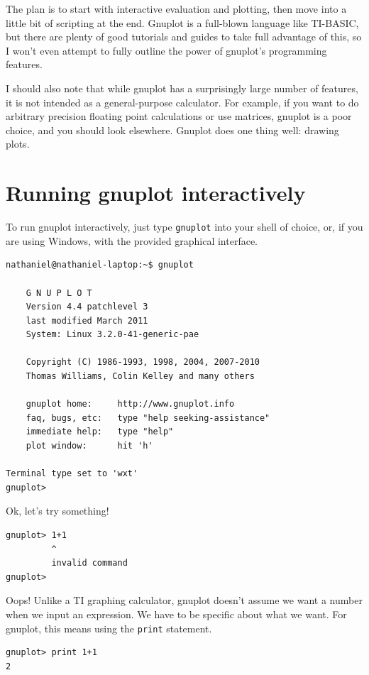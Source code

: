 \documentclass[11pt,letterpaper]{report}
\begin{document}
The plan is to start with interactive evaluation and plotting, then move into a little bit of scripting at the end. Gnuplot is a full-blown language like TI-BASIC, but there are plenty of good tutorials and guides to take full advantage of this, so I won't even attempt to fully outline the power of gnuplot's programming features.

I should also note that while gnuplot has a surprisingly large number of features, it is not intended as a general-purpose calculator. For example, if you want to do arbitrary precision floating point calculations or use matrices, 
 gnuplot is a poor choice, and you should look elsewhere. Gnuplot does one thing well: drawing plots.

\section{Running gnuplot interactively}

To run gnuplot interactively, just type \verb+gnuplot+ into your shell of choice, or, if you are using Windows, with the provided graphical interface.
\begin{lstlisting}
nathaniel@nathaniel-laptop:~$ gnuplot

	G N U P L O T
	Version 4.4 patchlevel 3
	last modified March 2011
	System: Linux 3.2.0-41-generic-pae

	Copyright (C) 1986-1993, 1998, 2004, 2007-2010
	Thomas Williams, Colin Kelley and many others

	gnuplot home:     http://www.gnuplot.info
	faq, bugs, etc:   type "help seeking-assistance"
	immediate help:   type "help"
	plot window:      hit 'h'

Terminal type set to 'wxt'
gnuplot> 
\end{lstlisting}

Ok, let's try something!

\begin{lstlisting}
gnuplot> 1+1
         ^
         invalid command
gnuplot> 
\end{lstlisting}

Oops! Unlike a TI graphing calculator, gnuplot doesn't assume we want a number when we input an expression. We have to be specific about what we want.
For gnuplot, this means using the \lstinline+print+ statement.

\begin{lstlisting}
gnuplot> print 1+1
2
\end{lstlisting}
\end{document}
